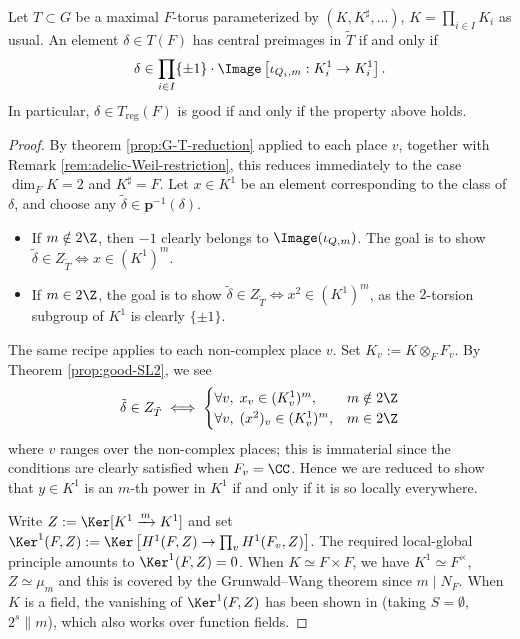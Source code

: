 \documentclass[a4paper,10pt]{article}
\begin{document}
\begin{proposition}\label{prop:good-T-global}
	Let $T \subset G$ be a maximal $F$-torus parameterized by $(K, K^\sharp, \ldots)$, $K = \prod_{i \in I} K_i$ as usual. An element $\delta \in T(F)$ has central preimages in $\tilde{T}$ if and only if
	\[ \delta \in \prod_{i \in I} \{\pm 1 \} \cdot \Image\left[ \iota_{Q_i,m}: K_i^1 \to K_i^1 \right]. \]
	In particular, $\delta \in T_{\mathrm{reg}}(F)$ is good if and only if the property above holds.
\end{proposition}
\begin{proof}
	By theorem \ref{prop:G-T-reduction} applied to each place $v$, together with Remark \ref{rem:adelic-Weil-restriction}, this reduces immediately to the case $\dim_F K = 2$ and $K^\sharp = F$. Let $x \in K^1$ be an element corresponding to the class of $\delta$, and choose any $\tilde{\delta} \in \bm{p}^{-1}(\delta)$.
	\begin{itemize}
		\item If $m \notin 2\Z$, then $-1$ clearly belongs to $\Image(\iota_{Q,m})$. The goal is to show $\tilde{\delta} \in Z_{\tilde{T}} \iff x \in (K^1)^m$.
		\item If $m \in 2\Z$, the goal is to show $\tilde{\delta} \in Z_{\tilde{T}} \iff x^2 \in (K^1)^m$, as the $2$-torsion subgroup of $K^1$ is clearly $\{\pm 1\}$.
	\end{itemize}
	The same recipe applies to each non-complex place $v$. Set $K_v := K \otimes_F F_v$. By Theorem \ref{prop:good-SL2}, we see
	\[ \tilde{\delta} \in Z_{\tilde{T}} \iff \begin{cases}
		\forall v, \; x_v \in (K^1_v)^m, & m \notin 2\Z \\
		\forall v, \; (x^2)_v \in (K^1_v)^m, &  m \in 2\Z
	\end{cases} \]
	where $v$ ranges over the non-complex places; this is immaterial since the conditions are clearly satisfied when $F_v = \CC$. Hence we are reduced to show that $y \in K^1$ is an $m$-th power in $K^1$ if and only if it is so locally everywhere.
	
	Write $Z := \Ker[K^1 \xrightarrow{m} K^1]$ and set $\Ker^1(F, Z) := \Ker\left[ H^1(F, Z) \to \prod_v H^1(F_v, Z)\right]$. The required local-global principle amounts to $\Ker^1(F,Z) = 0$. When $K \simeq F \times F$, we have $K^1 \simeq F^\times$, $Z \simeq \mu_m$ and this is covered by the Grunwald--Wang theorem since $m \mid N_F$. When $K$ is a field, the vanishing of $\Ker^1(F,Z)$ has been shown in \cite[Proposition 2.1]{Mi87T} (taking $S=\emptyset$, $2^s \| m$), which also works over function fields.
\end{proof}
\end{document}
